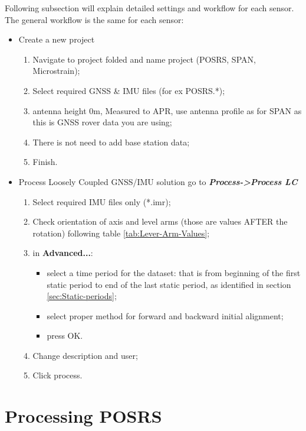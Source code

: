 \documentclass[11pt,fleqn]{book} %
\begin{document}
Following subsection will explain detailed settings and workflow for each sensor. The general workflow is the same for each sensor:

\medskip
\begin{itemize}
	\item Create a new project 
	\begin{enumerate}
		\item Navigate to project folded and name project (POSRS, SPAN, Microstrain);
		\item Select required GNSS \& IMU files (for ex POSRS.{*});
		\item antenna height 0m, Measured to APR, use antenna profile as for SPAN as this is GNSS rover data you are using;
		\item There is not need to add base station data;
		\item Finish.
	\end{enumerate}
	\item Process Loosely Coupled GNSS/IMU solution go to \textbf{\emph{Process->Process LC}}
		\begin{enumerate}
			\item Select required IMU files only ({*}.imr);
			\item Check orientation of axis and level arms (those are values AFTER the rotation) following table \ref{tab:Lever-Arm-Values};
			\item in \textbf{Advanced...}:
			\begin{itemize}
			 	\item select a time period for the dataset: that is from beginning of the first static period to end of the last static period, as identified in section \ref{sec:Static-periods};
			 	\item select proper method for forward and backward initial alignment;
			 	\item press OK.
			 \end{itemize} 
			\item Change description and user;
			\item Click process.
		\end{enumerate}
\end{itemize}



\section{Processing POSRS\label{sub:Processing-POSRS}}
\end{document}
